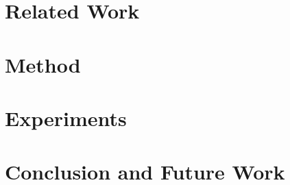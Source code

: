 \documentclass[conference]{IEEEtran}
\begin{document}
\section{Related Work}
\label{sec:related}


\section{Method}\label{sec:method}



\section{Experiments}
\label{sec:experiment}

\FloatBarrier

\section{Conclusion and Future Work}
\label{sec:conclusion}


{
\small


}
\end{document}

